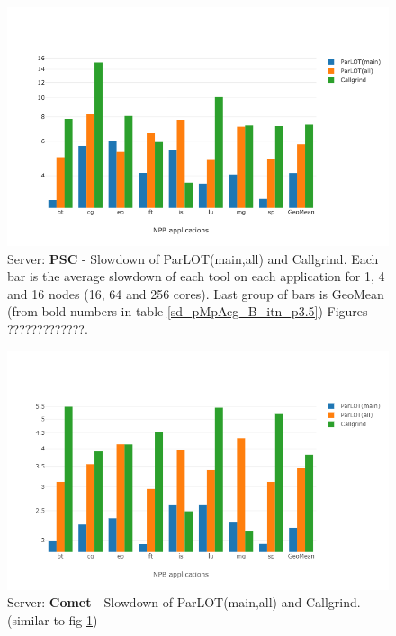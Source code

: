 \begin{figure}[!t]
\centering
\includegraphics[width=5in]{figs.psc/chartAvg_sd_B_p3_5.png}
\caption{ Server: \textbf{PSC} -  Slowdown of ParLOT(main,all) and Callgrind. Each bar is the average slowdown of each tool on each application for 1, 4 and 16 nodes (16, 64 and 256 cores). Last group of bars is GeoMean (from bold numbers in table \ref{sd_pMpAcg_B_itn_p3.5}) Figures ?????????????. 
}
\label{chartAvg_sd_B_p3_5}
\end{figure}


\begin{figure}[!t]
\centering
\includegraphics[width=5in]{figs.comet/comet_chartAvg_sd_B_p3_5.png}
\caption{ Server: \textbf{Comet} -  Slowdown of ParLOT(main,all) and Callgrind. (similar to fig \ref{chartAvg_sd_B_p3_5})
}
\label{comet_chartAvg_sd_B_p3_5}
\end{figure}